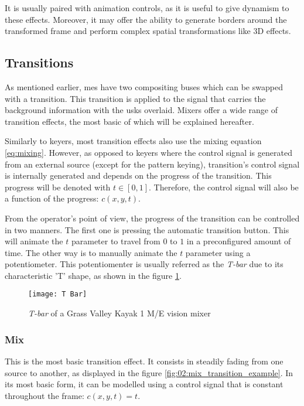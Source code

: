 \documentclass[../main.tex]{subfiles}
\begin{document}
It is usually paired with animation controls, as it is useful to give dynamism to these effects. Moreover, it may offer the ability to generate borders around the transformed frame\cite{atemManual} and perform complex spatial transformations like 3D effects\cite{xvsManual}.\newline

\subsection{Transitions}
As mentioned earlier, \glspl{me} have two compositing buses which can be swapped with a transition. This transition is applied to the signal that carries the background information with the \glspl{usk} overlaid. Mixers offer a wide range of transition effects, the most basic of which will be explained hereafter.\newline

Similarly to keyers, most transition effects also use the mixing equation \eqref{eq:mixing}. However, as opposed to keyers where the control signal is generated from an external source (except for the pattern keying), transition's control signal is internally generated and depends on the progress of the transition. This progress will be denoted with $t \in [0, 1]$. Therefore, the control signal will also be a function of the progress: $c(x, y, t)$.\newline

From the operator's point of view, the progress of the transition can be controlled in two manners. The first one is pressing the automatic transition button. This will animate the $t$ parameter to travel from $0$ to $1$ in a preconfigured amount of time. The other way is to manually animate the $t$ parameter using a potentiometer. This potentiomenter is usually referred as the \textit{T-bar} due to its characteristic 'T' shape, as shown in the figure \ref{fig:02:tbar}.\newline

\begin{figure}[htbp]
    \centering
    \texttt{[image: T Bar]}
    \caption{\textit{T-bar} of a Grass Valley Kayak 1 M/E vision mixer}
    \label{fig:02:tbar}
\end{figure}

\subsubsection{Mix}
This is the most basic transition effect. It consists in steadily fading from one source to another, as displayed in the figure \ref{fig:02:mix_transition_example}. In its most basic form, it can be modelled using a control signal that is constant throughout the frame: $c(x, y, t) = t$.\newline
\end{document}
